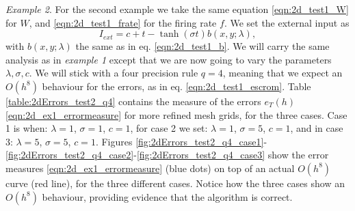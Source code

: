 \documentclass{uonmathreport}
\begin{document}
\textit{Example 2}. For the second example we take the same equation \ref{eqn:2d_test1_W} for $W$, and \ref{eqn:2d_test1_frate} for the firing rate $f$. We set the external input as
\begin{equation}
	I_{ext} = c + t -\tanh(\sigma t)b(x,y;\lambda),
\end{equation}
with $b(x,y;\lambda)$ the same as in eq. \ref{eqn:2d_test1_b}. We will carry the same analysis as in \textit{example 1} except that we are now going to vary the parameters $\lambda, \sigma, c$. We will stick with a four precision rule $q=4$, meaning that we expect an $O(h^8)$ behaviour for the errors, as in eq. \ref{eqn:2d_test1_escrom}. Table \ref{table:2dErrors_test2_q4} contains the measure of the errors $e_T(h)$ \ref{eqn:2d_ex1_errormeasure} for more refined mesh grids, for the three cases. Case 1 is when: $\lambda=1$, $\sigma=1$, $c=1$, for case 2 we set: $\lambda=1$, $\sigma=5$, $c=1$, and in case 3: $\lambda=5$, $\sigma=5$, $c=1$.  Figures \ref{fig:2dErrors_test2_q4_case1}-\ref{fig:2dErrors_test2_q4_case2}-\ref{fig:2dErrors_test2_q4_case3} show the error measures \ref{eqn:2d_ex1_errormeasure} (blue dots) on top of an actual $O(h^8)$ curve (red line), for the three different cases. Notice how the three cases show an $O(h^8)$ behaviour, providing evidence that the algorithm is correct.
\end{document}
